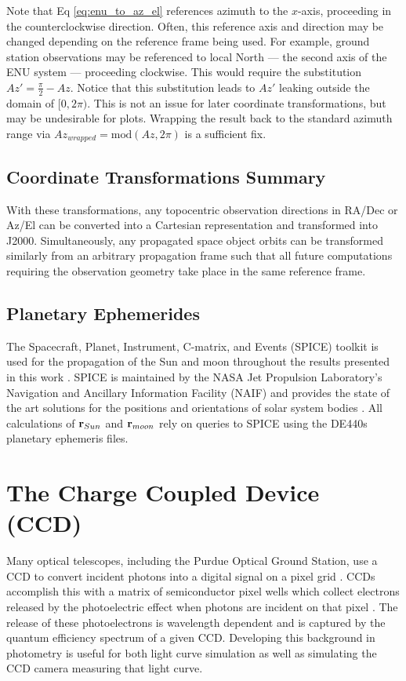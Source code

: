 Note that Eq \ref{eq:enu_to_az_el} references azimuth to the $x$-axis, proceeding in the
counterclockwise direction. Often, this reference axis and direction may be changed depending on the
reference frame being used. For example, ground station observations may be referenced to local
North ---  the second axis of the ENU system ---  proceeding clockwise. This would require the
substitution $Az' = \frac{\pi}{2} - Az$. Notice that this substitution leads to $Az'$ leaking
outside the domain of $[0, 2\pi)$. This is not an issue for later coordinate transformations, but
may be undesirable for plots. Wrapping the result back to the standard azimuth range via
$Az_{wrapped} = \textrm{mod}(Az, 2\pi)$ is a sufficient fix.

\subsection{Coordinate Transformations Summary}

With these transformations, any topocentric observation directions in RA/Dec or Az/El can be converted into a Cartesian representation and transformed into J2000. Simultaneously, any propagated space object orbits can be transformed similarly from an arbitrary propagation frame such that all future computations requiring the observation geometry take place in the same reference frame. 

\subsection{Planetary Ephemerides} \label{sec:planet_ephem}

The Spacecraft, Planet, Instrument, C-matrix, and Events (SPICE) toolkit is used for the propagation of the Sun and moon throughout the results presented in this work \cite{spice}. SPICE is maintained by the NASA Jet Propulsion Laboratory's Navigation and Ancillary Information Facility (NAIF) and provides the state of the art solutions for the positions and orientations of solar system bodies \cite{spice}. All calculations of $\mathbf{r}_{Sun}$ and $\mathbf{r}_{moon}$ rely on queries to SPICE using the DE440s planetary ephemeris files.

\section{The Charge Coupled Device (CCD)} \label{sec:ccd_performance}

Many optical telescopes, including the Purdue Optical Ground Station, use a CCD to convert incident photons into a digital signal on a pixel grid \cite{krag2003}. CCDs accomplish this with a matrix of semiconductor pixel wells which collect electrons released by the photoelectric effect when photons are incident on that pixel \cite{krag2003}. The release of these photoelectrons is wavelength dependent and is captured by the quantum efficiency spectrum of a given CCD. Developing this background in photometry is useful for both light curve simulation as well as simulating the CCD camera measuring that light curve. 

